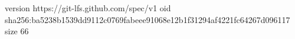 version https://git-lfs.github.com/spec/v1
oid sha256:ba5238b1539dd9112c0769fabeee91068e12b1f31294af4221fc64267d096117
size 66
